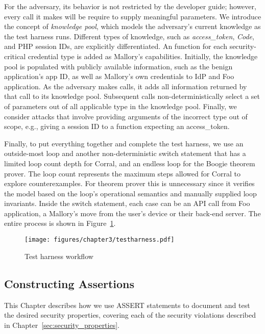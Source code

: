   For the adversary, its behavior is not restricted by the developer guide; however, every call it makes will be require to supply meaningful parameters.  We introduce the concept of \emph{knowledge pool}, which models the adversary's current knowledge as the test harness runs.  Different types of knowledge, such as \emph{access\_token}, \emph{Code}, and PHP session IDs, are explicitly differentiated.  An  function for each security-critical credential type is added as Mallory's capabilities.  Initially, the knowledge pool is populated with publicly available information, such as the benign application's app ID, as well as Mallory's own credentials to IdP and Foo application.  As the adversary makes calls, it adds all information returned by that call to its knowledge pool.  Subsequent calls non-deterministically select a set of parameters out of all applicable type in the knowledge pool.  Finally, we consider attacks that involve providing arguments of the incorrect type out of scope, e.g., giving a session ID to a function expecting an access\_token.

  Finally, to put everything together and complete the test harness, we use an outside-most loop and another non-deterministic switch statement that has a limited loop count depth for Corral, and an endless loop for the Boogie theorem prover.  The loop count represents the maximum steps allowed for Corral to explore counterexamples.  For theorem prover this is unnecessary since it verifies the model based on the loop's operational semantics and manually supplied loop invariants.  Inside the switch statement, each case can be an API call from Foo application, a Mallory's move from the user's device or their back-end server.  The entire process is shown in Figure~\ref{fig:testharness}.

\begin{figure}[hbt]
\centering
\texttt{[image: figures/chapter3/testharness.pdf]}
\caption{Test harness workflow}
\label{fig:testharness}
\end{figure}

\subsection{Constructing Assertions}
\label{explicating_constructing_assertions}
This Chapter describes how we use ASSERT statements to document and test the desired security properties, covering each of the security violations described in Chapter~\ref{sec:security_properties}. 


